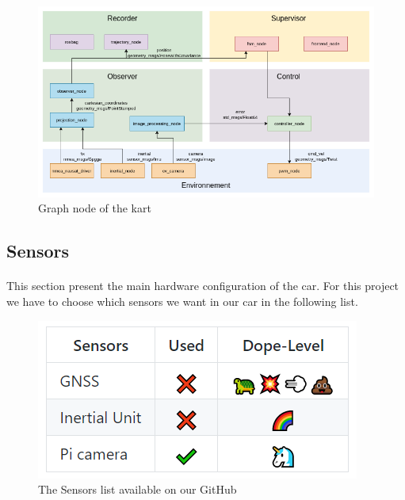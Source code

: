 \begin{figure}[!ht]
    \begin{center}
        \includegraphics[scale=0.4]{Images/node_graph.png}
    \end{center}
    \caption{Graph node of the kart}
    \label{fig:graphnode}
\end{figure}

\subsection{Sensors}

\paragraph{}This section present the main hardware configuration of the car. 
For this project we have to choose which sensors we want in our 
car in the following list.

\begin{figure}[!ht]
    \begin{center}
        \includegraphics[scale=0.6]{Images/Sensors.png}
    \end{center}
    \caption{The Sensors list available on our GitHub}
    \label{fig:sensors}
\end{figure}

